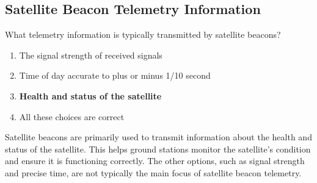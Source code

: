 \subsection{Satellite Beacon Telemetry Information}
\label{T8B01}

\begin{tcolorbox}[colback=gray!10!white,colframe=black!75!black,title=T8B01]
What telemetry information is typically transmitted by satellite beacons?
\begin{enumerate}[noitemsep]
    \item The signal strength of received signals
    \item Time of day accurate to plus or minus 1/10 second
    \item \textbf{Health and status of the satellite}
    \item All these choices are correct
\end{enumerate}
\end{tcolorbox}

Satellite beacons are primarily used to transmit information about the health and status of the satellite. This helps ground stations monitor the satellite's condition and ensure it is functioning correctly. The other options, such as signal strength and precise time, are not typically the main focus of satellite beacon telemetry.